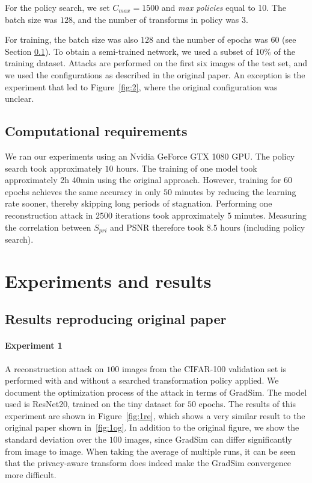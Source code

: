For the policy search, we set $C_{max} = 1500$ and \emph{max policies} equal to 10. The batch size was $128$, and the number of transforms in policy was $3$.

For training, the batch size was also $128$ and the number of epochs was $60$ (see Section \ref{section:computational-requirements}). To obtain a semi-trained network, we used a subset of $10\%$ of the training dataset. Attacks are performed on the first six images of the test set, and we used the configurations as described in the original paper. An exception is the experiment that led to Figure~\ref{fig:2}, where the original configuration was unclear.

\subsection{Computational requirements}
\label{section:computational-requirements}

We ran our experiments using an Nvidia GeForce GTX 1080 GPU. The policy search took approximately $10$ hours. The training of one model took approximately 2h 40min using the original approach. However, training for $60$ epochs achieves the same accuracy in only $50$ minutes by reducing the learning rate sooner, thereby skipping long periods of stagnation. Performing one reconstruction attack in $2500$ iterations took approximately $5$ minutes. Measuring the correlation between $S_{pri}$ and PSNR therefore took $8.5$ hours (including policy search).


\section{Experiments and results}
\label{sec:results}

\subsection{Results reproducing original paper}

\paragraph{Experiment 1} A reconstruction attack on $100$ images from the CIFAR-100 validation set is performed with and without a searched transformation policy applied. We document the optimization process of the attack in terms of GradSim. The model used is ResNet20, trained on the tiny dataset for $50$ epochs. The results of this experiment are shown in Figure~\ref{fig:1re}, which shows a very similar result to the original paper shown in~\ref{fig:1og}. In addition to the original figure, we show the standard deviation over the $100$ images, since GradSim can differ significantly from image to image. When taking the average of multiple runs, it can be seen that the privacy-aware transform does indeed make the GradSim convergence more difficult.

